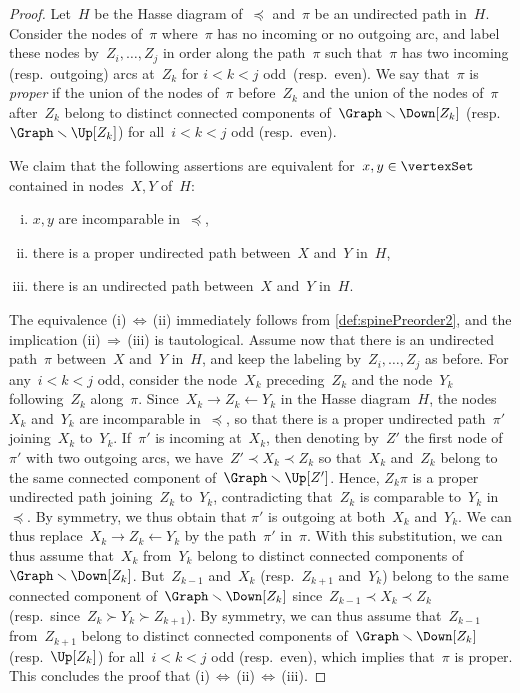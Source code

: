 \documentclass{amsart}
\theoremstyle{definition}
\newcommand{\ssm}{\smallsetminus} %
\newcommand{\darkblue}{\color{darkblue}} %
\newcommand{\defn}[1]{\textsl{\darkblue #1}} %
\begin{document}
\begin{proof}
  Let~$H$ be the Hasse diagram of~$\preccurlyeq$ and~$\pi$ be an undirected path in~$H$.
  Consider the nodes of~$\pi$ where~$\pi$ has no incoming or no outgoing arc, and label these nodes by~$Z_i, \dots, Z_j$ in order along the path~$\pi$ such that~$\pi$ has two incoming (resp.~outgoing) arcs at~$Z_k$ for $i < k < j$ odd~(resp.~even).
  We say that~$\pi$ is \defn{proper} if the union of the nodes of~$\pi$ before~$Z_k$ and the union of the nodes of~$\pi$ after~$Z_k$ belong to distinct connected components of~$\Graph \ssm \Down[Z_k]$ (resp.~$\Graph \ssm \Up[Z_k]$) for all~$i < k < j$ odd (resp.~even).
  
  We claim that the following assertions are equivalent for~$x,y \in \vertexSet$ contained in nodes~$X,Y$ of~$H$:
  \begin{enumerate}[(i)]
    \item $x,y$ are incomparable in~$\preccurlyeq$,
    \item there is a proper undirected path between~$X$ and~$Y$ in~$H$,
    \item there is an undirected path between~$X$ and~$Y$ in~$H$.
  \end{enumerate}
  The equivalence (i)\,$\Leftrightarrow$\,(ii) immediately follows from \cref{def:spinePreorder2}, and the implication (ii)\,$\Rightarrow$\,(iii) is tautological.
  Assume now that there is an undirected path~$\pi$ between~$X$ and~$Y$ in~$H$, and keep the labeling by~$Z_i, \dots, Z_j$ as before.
  For any~$i < k < j$ odd, consider the node~$X_k$ preceding~$Z_k$ and the node~$Y_k$ following~$Z_k$ along~$\pi$.
  Since~$X_k \rightarrow Z_k \leftarrow Y_k$ in the Hasse diagram~$H$, the nodes~$X_k$ and~$Y_k$ are incomparable in~$\preccurlyeq$, so that there is a proper undirected path~$\pi'$ joining~$X_k$ to~$Y_k$.
  If~$\pi'$ is incoming at~$X_k$, then denoting by~$Z'$ the first node of~$\pi'$ with two outgoing arcs, we have~$Z' \prec X_k \prec Z_k$ so that~$X_k$ and~$Z_k$ belong to the same connected component of~$\Graph \ssm \Up[Z']$.
  Hence, $Z_k\pi$ is a proper undirected path joining~$Z_k$ to~$Y_k$, contradicting that~$Z_k$ is comparable to~$Y_k$ in~$\preccurlyeq$.
  By symmetry, we thus obtain that $\pi'$ is outgoing at both~$X_k$ and~$Y_k$.
  We can thus replace~$X_k \rightarrow Z_k \leftarrow Y_k$ by the path~$\pi'$ in~$\pi$.
  With this substitution, we can thus assume that~$X_k$ from~$Y_k$ belong to distinct connected components of~$\Graph \ssm \Down[Z_k]$.
  But~$Z_{k-1}$ and~$X_k$ (resp.~$Z_{k+1}$ and~$Y_k$) belong to the same connected component of~$\Graph \ssm \Down[Z_k]$ since~$Z_{k-1} \prec X_k \prec Z_k$ (resp.~since~$Z_k \succ Y_k \succ Z_{k+1}$).
  By symmetry, we can thus assume that~$Z_{k-1}$ from~$Z_{k+1}$ belong to distinct connected components of~$\Graph \ssm \Down[Z_k]$ (resp.~$\Up[Z_k]$) for all~$i < k < j$ odd (resp.~even), which implies that~$\pi$ is proper.
  This concludes the proof that (i)\,$\Leftrightarrow$\,(ii)\,$\Leftrightarrow$\,(iii).
  

\end{proof}
\end{document}
